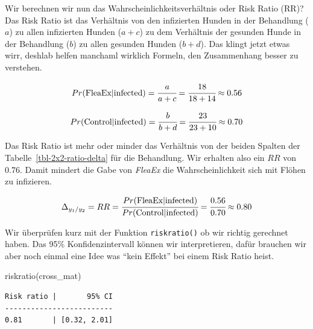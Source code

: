 \documentclass[
  letterpaper,
]{scrbook}
\newenvironment{Shaded}{\begin{snugshade}}{\end{snugshade}}
\newcommand{\FunctionTok}[1]{\textcolor[rgb]{0.28,0.35,0.67}{#1}}
\newcommand{\NormalTok}[1]{\textcolor[rgb]{0.00,0.23,0.31}{#1}}
\begin{document}
Wir berechnen wir nun das Wahrscheinlichkeitsverhältnis oder Risk Ratio
(RR)? Das Risk Ratio ist das Verhältnis von den infizierten Hunden in
der Behandlung (\(a\)) zu allen infizierten Hunden (\(a+c\)) zu dem
Verhältnis der gesunden Hunde in der Behandlung (\(b\)) zu allen
gesunden Hunden (\(b+d\)). Das klingt jetzt etwas wirr, deshlab helfen
manchaml wirklich Formeln, den Zusammenhang besser zu verstehen.

{}

\[
Pr(\mbox{FleaEx}|\mbox{infected}) = \cfrac{a}{a+c} = \cfrac{18}{18+14} \approx 0.56
\]

{}

\[
Pr(\mbox{Control}|\mbox{infected}) = \cfrac{b}{b+d} = \cfrac{23}{23 + 10} \approx 0.70
\]

Das Risk Ratio ist mehr oder minder das Verhältnis von der beiden
Spalten der Tabelle~\ref{tbl-2x2-ratio-delta} für die Behandlung. Wir
erhalten also ein \(RR\) von \(0.76\). Damit mindert die Gabe von
\emph{FleaEx} die Wahrscheinlichkeit sich mit Flöhen zu infizieren.

\[
\Delta_{y_1/y_2} = RR = \cfrac{Pr(\mbox{FleaEx}|\mbox{infected})}{Pr(\mbox{Control}|\mbox{infected})} =  \cfrac{0.56}{0.70} \approx 0.80 
\]

Wir überprüfen kurz mit der Funktion \texttt{riskratio()} ob wir richtig
gerechnet haben. Das 95\% Konfidenzintervall können wir interpretieren,
dafür brauchen wir aber noch einmal eine Idee was ``kein Effekt'' bei
einem Risk Ratio heist.

\begin{Shaded}
\begin{Highlighting}[]
\FunctionTok{riskratio}\NormalTok{(cross\_mat)}
\end{Highlighting}
\end{Shaded}

\begin{verbatim}
Risk ratio |       95% CI
-------------------------
0.81       | [0.32, 2.01]
\end{verbatim}
\end{document}
